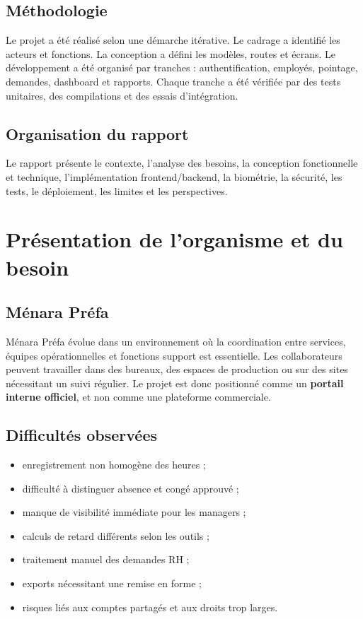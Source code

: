 \documentclass[11pt,a4paper,oneside]{report}
\newcommand{\menara}{Ménara Préfa}
\begin{document}
\section{Méthodologie}
Le projet a été réalisé selon une démarche itérative. Le cadrage a identifié les acteurs et fonctions. La conception a défini les modèles, routes et écrans. Le développement a été organisé par tranches : authentification, employés, pointage, demandes, dashboard et rapports. Chaque tranche a été vérifiée par des tests unitaires, des compilations et des essais d'intégration.
\section{Organisation du rapport}
Le rapport présente le contexte, l'analyse des besoins, la conception fonctionnelle et technique, l'implémentation frontend/backend, la biométrie, la sécurité, les tests, le déploiement, les limites et les perspectives.

\chapter{Présentation de l'organisme et du besoin}
\section{Ménara Préfa}
\menara{} évolue dans un environnement où la coordination entre services, équipes opérationnelles et fonctions support est essentielle. Les collaborateurs peuvent travailler dans des bureaux, des espaces de production ou sur des sites nécessitant un suivi régulier. Le projet est donc positionné comme un \textbf{portail interne officiel}, et non comme une plateforme commerciale.
\section{Difficultés observées}
\begin{itemize}
\item enregistrement non homogène des heures ;
\item difficulté à distinguer absence et congé approuvé ;
\item manque de visibilité immédiate pour les managers ;
\item calculs de retard différents selon les outils ;
\item traitement manuel des demandes RH ;
\item exports nécessitant une remise en forme ;
\item risques liés aux comptes partagés et aux droits trop larges.
\end{itemize}
\end{document}
